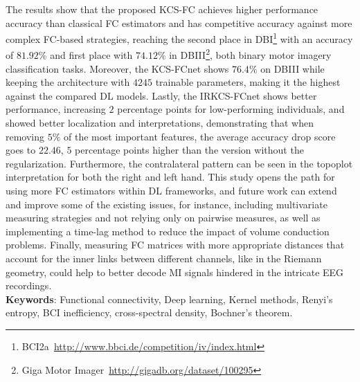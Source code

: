 The results show that the proposed KCS-FC achieves higher performance accuracy than classical FC estimators and has competitive accuracy against more complex FC-based strategies, reaching the second place in DBI\footnote{BCI2a~\url{http://www.bbci.de/competition/iv/index.html}} with an accuracy of $81.92\%$ and first place with $74.12\%$ in DBIII\footnote{Giga Motor Imager~\url{http://gigadb.org/dataset/100295}}, both binary motor imagery classification tasks. Moreover, the KCS-FCnet shows $76.4\%$ on DBIII while keeping the architecture with $4245$ trainable parameters, making it the highest against the compared DL models. Lastly, the IRKCS-FCnet shows better performance, increasing $2$ percentage points for low-performing individuals, and showed better localization and interpretations, demonstrating that when removing $5\%$ of the most important features, the average accuracy drop score goes to $22.46$, $5$ percentage points higher than the version without the regularization. Furthermore, the contralateral pattern can be seen in the topoplot interpretation for both the right and left hand. This study opens the path for using more FC estimators within DL frameworks, and future work can extend and improve some of the existing issues, for instance, including multivariate measuring strategies and not relying only on pairwise measures, as well as implementing a time-lag method to reduce the impact of volume conduction problems. Finally, measuring FC matrices with more appropriate distances that account for the inner links between different channels, like in the Riemann geometry, could help to better decode MI signals hindered in the intricate EEG recordings.
\\[2cm]
\textbf{Keywords}: Functional connectivity, Deep learning, Kernel methods, Renyi's entropy, BCI inefficiency, cross-spectral density, Bochner's theorem.

